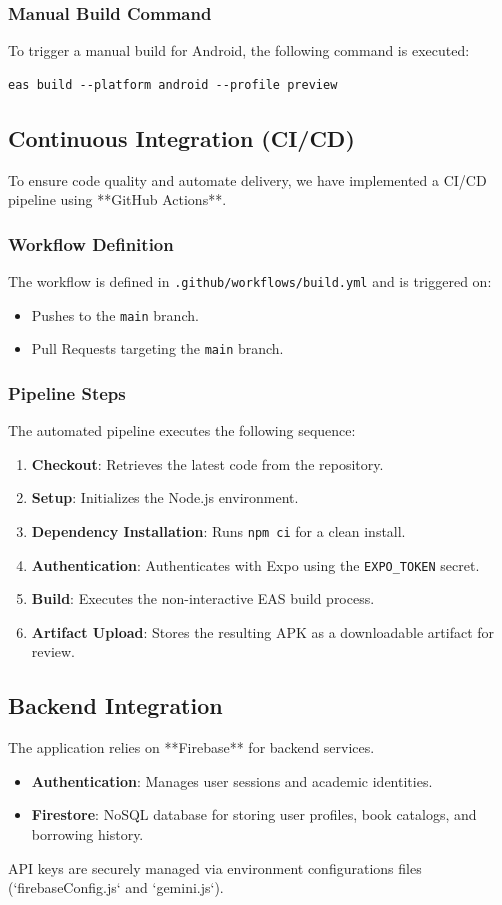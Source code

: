 \documentclass[12pt,a4paper]{article}
\begin{document}
\subsubsection{Manual Build Command}
To trigger a manual build for Android, the following command is executed:
\begin{lstlisting}
eas build --platform android --profile preview
\end{lstlisting}

\subsection{Continuous Integration (CI/CD)}
To ensure code quality and automate delivery, we have implemented a CI/CD pipeline using **GitHub Actions**.

\subsubsection{Workflow Definition}
The workflow is defined in \texttt{.github/workflows/build.yml} and is triggered on:
\begin{itemize}
    \item Pushes to the \texttt{main} branch.
    \item Pull Requests targeting the \texttt{main} branch.
\end{itemize}

\subsubsection{Pipeline Steps}
The automated pipeline executes the following sequence:
\begin{enumerate}
    \item \textbf{Checkout}: Retrieves the latest code from the repository.
    \item \textbf{Setup}: Initializes the Node.js environment.
    \item \textbf{Dependency Installation}: Runs \texttt{npm ci} for a clean install.
    \item \textbf{Authentication}: Authenticates with Expo using the \texttt{EXPO\_TOKEN} secret.
    \item \textbf{Build}: Executes the non-interactive EAS build process.
    \item \textbf{Artifact Upload}: Stores the resulting APK as a downloadable artifact for review.
\end{enumerate}

\subsection{Backend Integration}
The application relies on **Firebase** for backend services.
\begin{itemize}
    \item \textbf{Authentication}: Manages user sessions and academic identities.
    \item \textbf{Firestore}: NoSQL database for storing user profiles, book catalogs, and borrowing history.
\end{itemize}
API keys are securely managed via environment configurations files (`firebaseConfig.js` and `gemini.js`).
\end{document}
